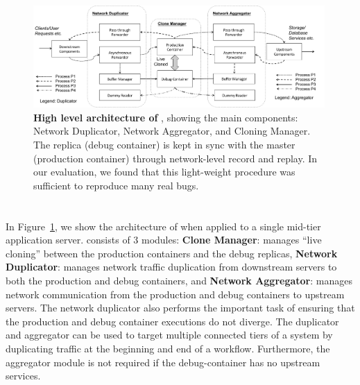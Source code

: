 
\begin{figure}[t]
	\begin{centering}
		\includegraphics[width=0.99\textwidth]{parikshan/figs/arch_full.pdf}
		\caption{\textbf{High level architecture of \parikshan}, showing the main components: Network Duplicator, Network Aggregator, and Cloning Manager. The replica (debug container) is kept in sync with the master (production container) through network-level record and replay. In our evaluation, we found that this light-weight procedure was sufficient to reproduce many real bugs.}
		\label{fig:network_arch}
	\end{centering}
\end{figure}



\section{\parikshan}
\label{sec:parikshanDesign}

In Figure~\ref{fig:network_arch}, we show the architecture of \parikshan when applied to a single mid-tier application server.
\parikshan consists of 3 modules: 
\textbf{Clone Manager}: manages ``live cloning'' between the production containers and the debug replicas, 
\textbf{Network Duplicator}: manages network traffic duplication from downstream servers to both the production and debug containers, 
and \textbf{Network Aggregator}: manages network communication from the production and debug containers to upstream servers.
The network duplicator also performs the important task of ensuring that the production and debug container executions do not diverge.
The duplicator and aggregator can be used to target multiple connected tiers of a system by duplicating traffic at the beginning and end of a workflow.
Furthermore, the aggregator module is not required if the debug-container has no upstream services. 


